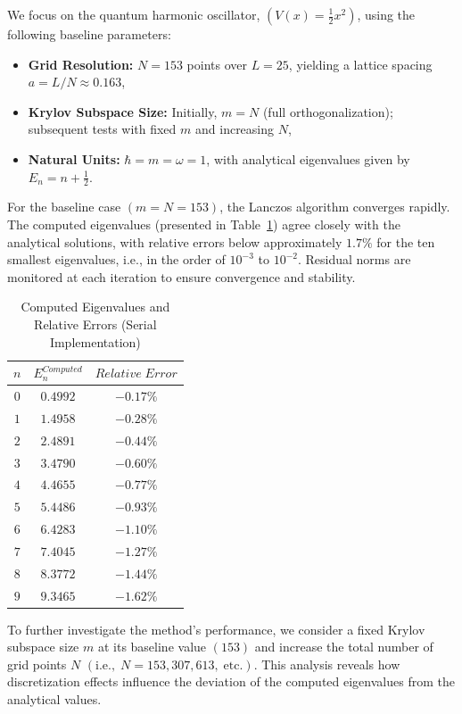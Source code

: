 \documentclass[12pt,a4paper]{report}
\begin{document}
We focus on the quantum harmonic oscillator, $(V(x) = \frac{1}{2}x^2)$, using the following baseline parameters:
\begin{itemize}
    \item \textbf{Grid Resolution:} $N = 153$ points over $L = 25$, yielding a lattice spacing $a = L / N \approx 0.163$,
    \item \textbf{Krylov Subspace Size:} Initially, $m = N$ (full orthogonalization); subsequent tests with fixed $m$ and increasing $N$,
    \item \textbf{Natural Units:} $\hbar = m = \omega = 1$, with analytical eigenvalues given by $E_n = n + \frac{1}{2}$.
\end{itemize}
For the baseline case $(m = N = 153)$, the Lanczos algorithm converges rapidly. The computed eigenvalues (presented in Table~\ref{tab:serial_eigenvalues}) agree closely with the analytical solutions, with relative errors below approximately $1.7\%$ for the ten smallest eigenvalues, i.e., in the order of $10^{-3}$ to $10^{-2}$. Residual norms are monitored at each iteration to ensure convergence and stability.
\begin{table}[h]
    \centering
    \caption{Computed Eigenvalues and Relative Errors (Serial Implementation)}
    \label{tab:serial_eigenvalues}
    \begin{tabular}{ccc}
    \hline
    $n$ & $E_n^{Computed}$ & $Relative\;Error$ \\ \hline
    $0$ & $0.4992$ & $-0.17\%$ \\
    $1$ & $1.4958$ & $-0.28\%$ \\
    $2$ & $2.4891$ & $-0.44\%$ \\
    $3$ & $3.4790$ & $-0.60\%$ \\
    $4$ & $4.4655$ & $-0.77\%$ \\
    $5$ & $5.4486$ & $-0.93\%$ \\
    $6$ & $6.4283$ & $-1.10\%$ \\
    $7$ & $7.4045$ & $-1.27\%$ \\
    $8$ & $8.3772$ & $-1.44\%$ \\
    $9$ & $9.3465$ & $-1.62\%$ \\ \hline
    \end{tabular}
\end{table}
To further investigate the method’s performance, we consider a fixed Krylov subspace size $m$ at its baseline value $(153)$ and increase the total number of grid points $N$ $(\text{i.e.}, \; N = 153, 307, 613, \; \text{etc.})$. This analysis reveals how discretization effects influence the deviation of the computed eigenvalues from the analytical values.
\end{document}
